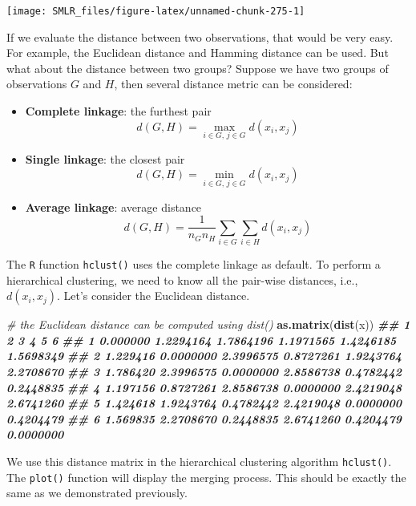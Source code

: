 \documentclass[
]{book}
\newenvironment{Shaded}{\begin{snugshade}}{\end{snugshade}}
\newcommand{\CommentTok}[1]{\textcolor[rgb]{0.56,0.35,0.01}{\textit{#1}}}
\newcommand{\DocumentationTok}[1]{\textcolor[rgb]{0.56,0.35,0.01}{\textbf{\textit{#1}}}}
\newcommand{\FunctionTok}[1]{\textcolor[rgb]{0.13,0.29,0.53}{\textbf{#1}}}
\newcommand{\NormalTok}[1]{#1}
\providecommand{\tightlist}{%
  \setlength{\itemsep}{0pt}\setlength{\parskip}{0pt}}
\theoremstyle{definition}
\theoremstyle{definition}
\theoremstyle{definition}
\theoremstyle{definition}
\theoremstyle{remark}
\begin{document}
\begin{center}\texttt{[image: SMLR\_files/figure-latex/unnamed-chunk-275-1]} \end{center}

If we evaluate the distance between two observations, that would be very easy. For example, the Euclidean distance and Hamming distance can be used. But what about the distance between two groups? Suppose we have two groups of observations \(G\) and \(H\), then several distance metric can be considered:

\begin{itemize}
\tightlist
\item
  \textbf{Complete linkage}: the furthest pair
  \[d(G, H) = \underset{i \in G, \, j \in G}{\max} d(x_i, x_j)\]
\item
  \textbf{Single linkage}: the closest pair
  \[d(G, H) = \underset{i \in G, \, j \in G}{\min} d(x_i, x_j)\]
\item
  \textbf{Average linkage}: average distance
  \[d(G, H) = \frac{1}{n_G n_H} \sum_{i \in G} \sum_{i \in H} d(x_i, x_j)\]
\end{itemize}

The \texttt{R} function \texttt{hclust()} uses the complete linkage as default. To perform a hierarchical clustering, we need to know all the pair-wise distances, i.e., \(d(x_i, x_j)\). Let's consider the Euclidean distance.

\begin{Shaded}
\begin{Highlighting}[]
  \CommentTok{\# the Euclidean distance can be computed using dist()}
  \FunctionTok{as.matrix}\NormalTok{(}\FunctionTok{dist}\NormalTok{(x))}
\DocumentationTok{\#\#          1         2         3         4         5         6}
\DocumentationTok{\#\# 1 0.000000 1.2294164 1.7864196 1.1971565 1.4246185 1.5698349}
\DocumentationTok{\#\# 2 1.229416 0.0000000 2.3996575 0.8727261 1.9243764 2.2708670}
\DocumentationTok{\#\# 3 1.786420 2.3996575 0.0000000 2.8586738 0.4782442 0.2448835}
\DocumentationTok{\#\# 4 1.197156 0.8727261 2.8586738 0.0000000 2.4219048 2.6741260}
\DocumentationTok{\#\# 5 1.424618 1.9243764 0.4782442 2.4219048 0.0000000 0.4204479}
\DocumentationTok{\#\# 6 1.569835 2.2708670 0.2448835 2.6741260 0.4204479 0.0000000}
\end{Highlighting}
\end{Shaded}

We use this distance matrix in the hierarchical clustering algorithm \texttt{hclust()}. The \texttt{plot()} function will display the merging process. This should be exactly the same as we demonstrated previously.
\end{document}
